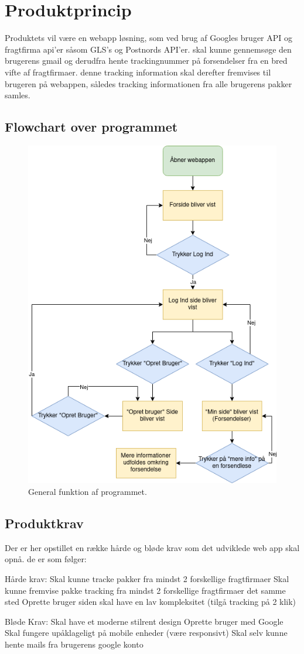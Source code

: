 \chapter{Produktprincip}
Produktets vil være en webapp løsning, som ved brug af Googles bruger API og fragtfirma 
api’er såsom GLS’s og Postnords API'er. skal kunne gennemsøge den brugerens gmail og 
derudfra hente trackingnummer på forsendelser fra en bred vifte af fragtfirmaer. denne 
tracking information skal derefter fremvises til brugeren på webappen, således tracking 
informationen fra alle brugerens pakker samles.
\section{Flowchart over programmet}
\begin{figure}[h]
    \includegraphics[width=0.5\linewidth]{Pictures/flowchat-main.png}
    \centering
    \caption{General funktion af programmet.}
     \label{fig:drill-backplate}
  \end{figure}
  

\section{Produktkrav}
Der er her opstillet en række hårde og bløde krav som det udviklede web app skal opnå. de er som følger:

Hårde krav:
Skal kunne tracke pakker fra mindst 2 forskellige fragtfirmaer
Skal kunne fremvise pakke tracking fra mindst 2 forskellige fragtfirmaer det samme sted
Oprette bruger
siden skal have en lav kompleksitet (tilgå tracking på 2 klik)

Bløde Krav:
Skal have et moderne stilrent design
Oprette bruger med Google
Skal fungere upåklageligt på mobile enheder (være responsivt)
Skal selv kunne hente mails fra brugerens google konto
